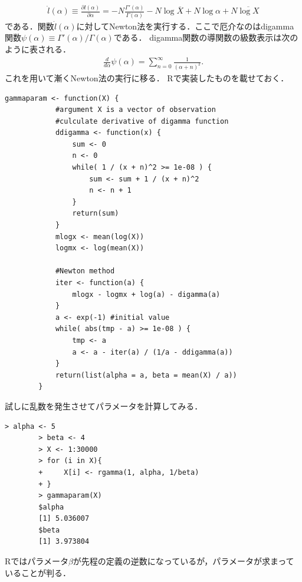 \documentclass[a4j,papersize,disablejfam,slide,14pt]{jsarticle}
\def\Log#1{\operatorname{log} #1} %
\begin{document}
    \begin{align}
    	\dot{l}(\alpha) \equiv \frac{\partial l(\alpha)}{\partial \alpha} 
        = -N \frac{\Gamma'(\alpha)}{\Gamma(\alpha)} - N \Log{\overline{X}} + N \Log{\alpha} + N \overline{\Log{X}}
    \end{align}
    である．関数$\dot{l}(\alpha)$に対して{\rm Newton}法を実行する．ここで厄介なのは{\rm digamma}関数$\psi(\alpha) \equiv \Gamma'(\alpha)/\Gamma(\alpha)$である．
    {\rm digamma}関数の導関数の級数表示は次のように表される．
    \begin{align}
    	\frac{d}{d \alpha} \psi(\alpha) = \sum_{n=0}^{\infty} \frac{1}{(\alpha + n)^2}.
    \end{align}
    これを用いて漸く{\rm Newton}法の実行に移る．
    {\rm R}で実装したものを載せておく．
    \begin{lstlisting}[style=customR]
    	gammaparam <- function(X) {
        	#argument X is a vector of observation
        	#culculate derivative of digamma function
            ddigamma <- function(x) {
            	sum <- 0
                n <- 0
                while( 1 / (x + n)^2 >= 1e-08 ) {
                	sum <- sum + 1 / (x + n)^2
                    n <- n + 1
                }
                return(sum)
            }
            mlogx <- mean(log(X))
            logmx <- log(mean(X))
            
            #Newton method
            iter <- function(a) {
            	mlogx - logmx + log(a) - digamma(a)
            }
            a <- exp(-1) #initial value
            while( abs(tmp - a) >= 1e-08 ) {
            	tmp <- a
            	a <- a - iter(a) / (1/a - ddigamma(a))
            }
            return(list(alpha = a, beta = mean(X) / a)) 
        }
    \end{lstlisting}
    試しに乱数を発生させてパラメータを計算してみる．
    \begin{lstlisting}[style=customR]
    	> alpha <- 5
		> beta <- 4
		> X <- 1:30000
		> for (i in X){
		+     X[i] <- rgamma(1, alpha, 1/beta)
		+ }
		> gammaparam(X)
		$alpha
		[1] 5.036007
        $beta
        [1] 3.973804
	\end{lstlisting}
    {\rm R}ではパラメータ$\beta$が先程の定義の逆数になっているが，パラメータが求まっていることが判る．
\end{document}
